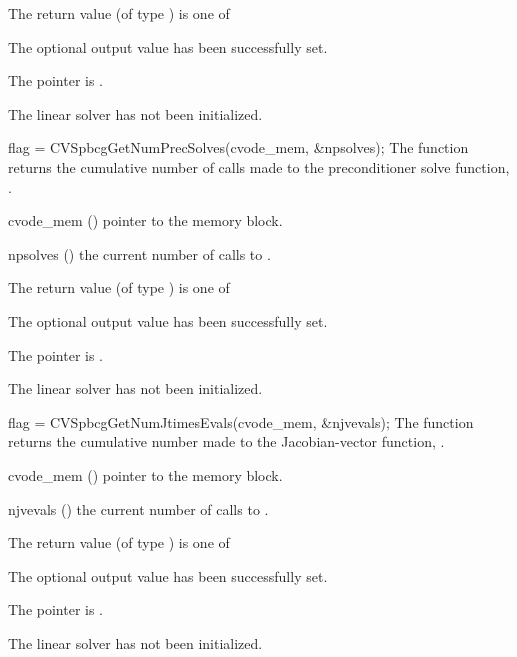 {
  The return value  (of type ) is one of
  \begin{args}
  \item[\Id{CVSPBCG\_SUCCESS}] 
    The optional output value has been successfully set.
  \item[\Id{CVSPBCG\_MEM\_NULL}]
    The  pointer is .
  \item[\Id{CVSPBCG\_LMEM\_NULL}]
    The {\cvspbcg} linear solver has not been initialized.
  \end{args}
}
{}
{
  flag = CVSpbcgGetNumPrecSolves(cvode\_mem, \&npsolves);
}
{
  The function  returns the
  cumulative number of calls made to the preconditioner 
  solve function, .
}
{
  \begin{args}
  \item[cvode\_mem] ()
    pointer to the {\cvodes} memory block.
  \item[npsolves] ()
    the current number of calls to .
  \end{args}
}
{
  The return value  (of type ) is one of
  \begin{args}
  \item[\Id{CVSPBCG\_SUCCESS}] 
    The optional output value has been successfully set.
  \item[\Id{CVSPBCG\_MEM\_NULL}]
    The  pointer is .
  \item[\Id{CVSPBCG\_LMEM\_NULL}]
    The {\cvspbcg} linear solver has not been initialized.
  \end{args}
}
{}
{
  flag = CVSpbcgGetNumJtimesEvals(cvode\_mem, \&njvevals);
}
{
  The function  returns the
  cumulative number made to the Jacobian-vector function,
  .
}
{
  \begin{args}
  \item[cvode\_mem] ()
    pointer to the {\cvodes} memory block.
  \item[njvevals] ()
    the current number of calls to .
  \end{args}
}
{
  The return value  (of type ) is one of
  \begin{args}
  \item[\Id{CVSPBCG\_SUCCESS}] 
    The optional output value has been successfully set.
  \item[\Id{CVSPBCG\_MEM\_NULL}]
    The  pointer is .
  \item[\Id{CVSPBCG\_LMEM\_NULL}]
    The {\cvspbcg} linear solver has not been initialized.
  \end{args}
}
